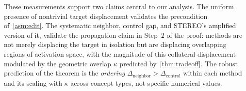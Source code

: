These measurements support two claims central to our analysis. The uniform presence of nontrivial target displacement validates the precondition of~\cref{asm:edit}. The systematic neighbor, control gap, and STEREO's amplified version of it, validate the propagation claim in Step~2 of the proof: methods are not merely displacing the target in isolation but are displacing overlapping regions of activation space, with the magnitude of this collateral displacement modulated by the geometric overlap $\kappa$ predicted by~\cref{thm:tradeoff}. The robust prediction of the theorem is the \emph{ordering} $\Delta_{\mathrm{neighbor}} > \Delta_{\mathrm{control}}$ within each method and its scaling with $\kappa$ across concept types, not specific numerical values.



